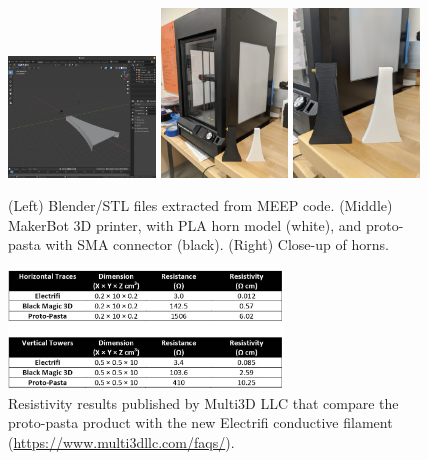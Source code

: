\documentclass[../../main.tex]{subfiles}
\begin{document}
\begin{figure}
\centering
\includegraphics[width=0.35\textwidth]{figures/blender_example.png}
\includegraphics[width=0.3\textwidth]{figures/3dprinter.jpg}
\includegraphics[width=0.3\textwidth]{figures/3dprinter_2.jpg}
\caption{\label{fig:3d_print} (Left) Blender/STL files extracted from MEEP code.  (Middle) MakerBot 3D printer, with PLA horn model (white), and  proto-pasta with SMA connector (black). (Right) Close-up of horns.}
\end{figure}

\begin{figure}[hb]
\centering
\includegraphics[width=0.65\textwidth]{figures/multi3dllc.png}
\caption{\label{fig:3d_print2} Resistivity results published by Multi3D LLC that compare the proto-pasta product with the new Electrifi conductive filament (\url{https://www.multi3dllc.com/faqs/}).}
\end{figure}
\end{document}
